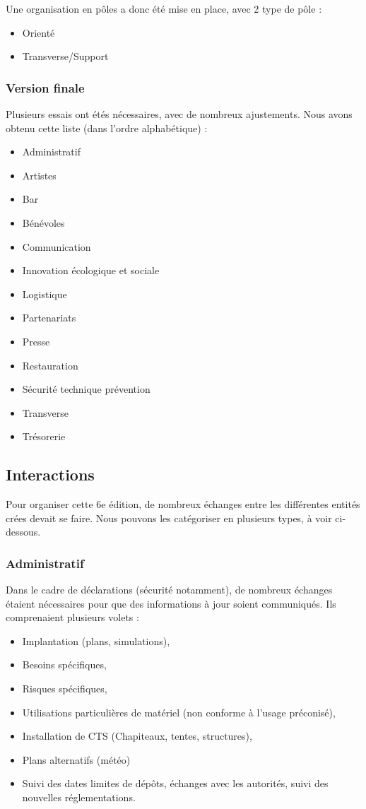 \documentclass[12pt,a4paper]{report}
\begin{document}
Une organisation en pôles a donc été mise en place, avec 2 type de pôle : 
\begin{itemize}
\item Orienté
\item Transverse/Support
\end{itemize}

\subsubsection{Version finale}
Plusieurs essais ont étés nécessaires, avec de nombreux ajustements. Nous avons obtenu cette liste (dans l'ordre alphabétique) : 
\begin{itemize}
\item Administratif
\item Artistes
\item Bar
\item Bénévoles
\item Communication
\item Innovation écologique et sociale
\item Logistique
\item Partenariats
\item Presse
\item Restauration
\item Sécurité technique prévention
\item Transverse
\item Trésorerie
\end{itemize}

\subsection{Interactions}
Pour organiser cette 6e édition, de nombreux échanges entre les différentes entités crées devait se faire. Nous pouvons les catégoriser en plusieurs types, à voir ci-dessous.

\subsubsection{Administratif}
Dans le cadre de déclarations (sécurité notamment), de nombreux échanges étaient nécessaires pour que des informations à jour soient communiqués. Ils comprenaient plusieurs volets :
\begin{itemize}
\item Implantation (plans, simulations),
\item Besoins spécifiques,
\item Risques spécifiques,
\item Utilisations particulières de matériel (non conforme à l'usage préconisé),
\item Installation de CTS (Chapiteaux, tentes, structures),
\item Plans alternatifs (météo)
\item Suivi des dates limites de dépôts, échanges avec les autorités, suivi des nouvelles réglementations.
\end{itemize}
\end{document}
